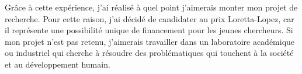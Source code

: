 \documentclass[16pt]{article}
\begin{document}
	Grâce à cette expérience, j'ai réalisé à quel point j'aimerais monter mon projet de recherche. Pour cette raison, j'ai décidé de candidater au prix Loretta-Lopez, car il représente une possibilité unique de financement pour les jeunes chercheurs. Si mon projet n'est pas retenu, j'aimerais travailler dans un laboratoire académique ou industriel qui cherche à résoudre des problématiques qui touchent à la société et au développement humain.
\end{document}
